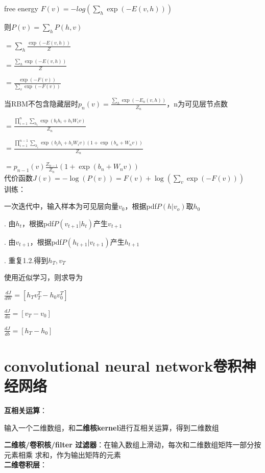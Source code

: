 \documentclass[UTF8]{ctexart}
\begin{document}
  free energy $F(v) = -log(\sum_h \exp(-E(v, h)))$

  \quad 则$P(v) = \sum_h P(h, v)$

  \quad \quad $ = \sum_h \frac{\exp(-E(v, h))}{Z}$

  \quad \quad $ = \frac{\sum_h\exp(-E(v, h))}{Z}$

  \quad \quad $ = \frac{\exp(-F(v))}{\sum_v \exp(-F(v))}$

  当RBM不包含隐藏层时$p_n(v) = \frac{\sum_h \exp(-E_n(v, h))}{Z_n}$，n为可见层节点数

  \quad $ = \frac{\prod_{i=1}^{n} \sum_{h_i} \exp(b_ih_i + h_iW_iv)}{Z_n}$

  \quad $ = \frac{\prod_{i=1}^{n - 1} \sum_{h_i} \exp(b_ih_i + h_iW_iv)(1 + \exp(b_n + W_nv))}{Z_n}$

  \quad $ = p_{n-1}(v)\frac{Z_{n-1}}{Z_n}(1 + \exp(b_n + W_nv))$\\
代价函数$J(v) = -\log(P(v)) = F(v) + \log(\sum_v\exp(-F(v)))$\\
训练： 

  一次迭代中，输入样本为可见层向量$v_0$，根据pdf$P(h | v_o)$取$h_0$

  . 由$h_t$，根据pdf$P(v_{t+1} | h_t)$产生$v_{t+1}$

  . 由$v_{t+1}$，根据pdf$P(h_{t+1} | v_{t+1})$产生$h_{t+1}$

  . 重复1.2.得到$h_T, v_T$

  \quad 使用近似学习，则求导为
  
  \quad \quad $\frac{dJ}{dW} = [h_Tv_T^T - h_0v_0^T]$

  \quad \quad $\frac{dJ}{da} = [v_T - v_0]$

  \quad \quad $\frac{dJ}{db} = [h_T - h_0]$


\section{convolutional neural network卷积神经网络}
\noindent \textbf{互相关运算}：

  输入一个二维数组，和\textbf{二维核kernel}进行互相关运算，得到二维数组

  \textbf{二维核/卷积核/filter 过滤器}：在输入数组上滑动，每次和二维数组矩阵一部分按元素相乘 求和，作为输出矩阵的元素\\
\textbf{二维卷积层}：
\end{document}
